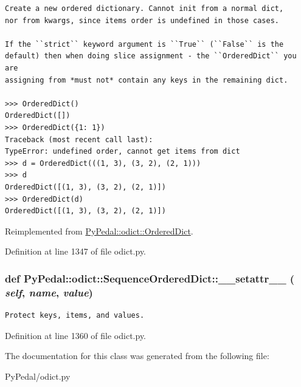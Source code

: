 \footnotesize\begin{verbatim}
Create a new ordered dictionary. Cannot init from a normal dict,
nor from kwargs, since items order is undefined in those cases.

If the ``strict`` keyword argument is ``True`` (``False`` is the
default) then when doing slice assignment - the ``OrderedDict`` you are
assigning from *must not* contain any keys in the remaining dict.

>>> OrderedDict()
OrderedDict([])
>>> OrderedDict({1: 1})
Traceback (most recent call last):
TypeError: undefined order, cannot get items from dict
>>> d = OrderedDict(((1, 3), (3, 2), (2, 1)))
>>> d
OrderedDict([(1, 3), (3, 2), (2, 1)])
>>> OrderedDict(d)
OrderedDict([(1, 3), (3, 2), (2, 1)])
\end{verbatim}
\normalsize
 

Reimplemented from \hyperlink{classPyPedal_1_1odict_1_1OrderedDict_2819b83b7012be60ef9936b6716b9f7c}{PyPedal::odict::OrderedDict}.

Definition at line 1347 of file odict.py.\hypertarget{classPyPedal_1_1odict_1_1SequenceOrderedDict_0141943432f71113ff9998bd8087e50d}{
\subsubsection{\setlength{\rightskip}{0pt plus 5cm}def PyPedal::odict::SequenceOrderedDict::\_\-\_\-setattr\_\-\_\- ( {\em self}, \/   {\em name}, \/   {\em value})}}
\label{classPyPedal_1_1odict_1_1SequenceOrderedDict_0141943432f71113ff9998bd8087e50d}




\footnotesize\begin{verbatim}Protect keys, items, and values.\end{verbatim}
\normalsize
 

Definition at line 1360 of file odict.py.

The documentation for this class was generated from the following file:\begin{CompactItemize}
\item 
PyPedal/odict.py\end{CompactItemize}
